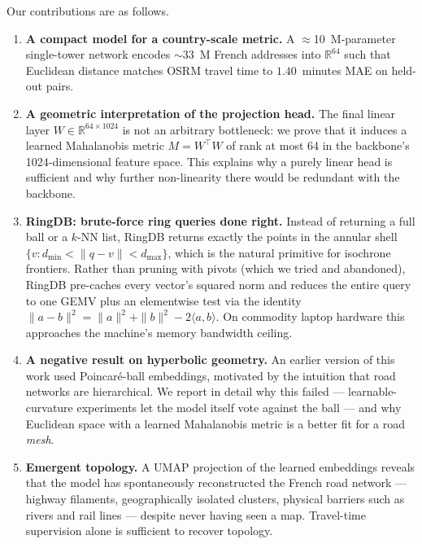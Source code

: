 \documentclass[11pt,a4paper]{article}
\begin{document}
Our contributions are as follows.
\begin{enumerate}
  \item \textbf{A compact model for a country-scale metric.} A
    $\approx$10~M-parameter single-tower network encodes $\sim$33~M
    French addresses into $\mathbb{R}^{64}$ such that Euclidean
    distance matches OSRM travel time to $1.40$~minutes MAE on
    held-out pairs.
  \item \textbf{A geometric interpretation of the projection head.}
    The final linear layer $W \in \mathbb{R}^{64 \times 1024}$ is not
    an arbitrary bottleneck: we prove that it induces a learned
    Mahalanobis metric $M = W^\top W$ of rank at most 64 in the
    backbone's 1024-dimensional feature space. This explains why a
    purely linear head is sufficient and why further non-linearity
    there would be redundant with the backbone.
  \item \textbf{RingDB: brute-force ring queries done right.} Instead
    of returning a full ball or a $k$-NN list, RingDB returns exactly
    the points in the annular shell
    $\{v : d_\text{min} < \|q - v\| < d_\text{max}\}$, which is the
    natural primitive for isochrone frontiers. Rather than pruning
    with pivots (which we tried and abandoned), RingDB pre-caches
    every vector's squared norm and reduces the entire query to one
    GEMV plus an elementwise test via the identity
    $\|a-b\|^2 = \|a\|^2 + \|b\|^2 - 2\langle a,b\rangle$. On
    commodity laptop hardware this approaches the machine's memory
    bandwidth ceiling.
  \item \textbf{A negative result on hyperbolic geometry.} An earlier
    version of this work used Poincar\'e-ball embeddings, motivated
    by the intuition that road networks are hierarchical. We report
    in detail why this failed --- learnable-curvature experiments
    let the model itself vote against the ball --- and why Euclidean
    space with a learned Mahalanobis metric is a better fit for a
    road \emph{mesh}.
  \item \textbf{Emergent topology.} A UMAP projection of the learned
    embeddings reveals that the model has spontaneously reconstructed
    the French road network --- highway filaments, geographically
    isolated clusters, physical barriers such as rivers and rail
    lines --- despite never having seen a map. Travel-time supervision
    alone is sufficient to recover topology.
\end{enumerate}

\end{document}
